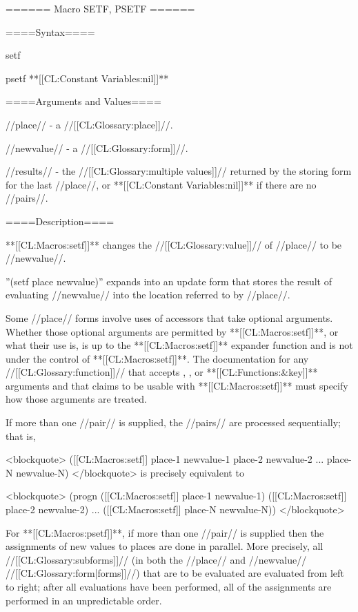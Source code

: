 ====== Macro SETF, PSETF ======

====Syntax====

\DefmacWithValues setf {} {}

\DefmacWithValues psetf {} {**[[CL:Constant Variables:nil]]**}


====Arguments and Values====

//place// - a //[[CL:Glossary:place]]//.

//newvalue// - a //[[CL:Glossary:form]]//.


//results// - the //[[CL:Glossary:multiple values]]// returned by the storing form for the last //place//, or **[[CL:Constant Variables:nil]]** if there are no //pairs//.

====Description====

**[[CL:Macros:setf]]** changes the //[[CL:Glossary:value]]// of //place// to be //newvalue//.

''(setf place newvalue)'' expands into an update form that stores the result of evaluating //newvalue// into the location referred to by //place//.

Some //place// forms involve uses of accessors that take optional arguments. Whether those optional arguments are permitted by **[[CL:Macros:setf]]**, or what their use is, is up to the **[[CL:Macros:setf]]** expander function and is not under the control of **[[CL:Macros:setf]]**. The documentation for any //[[CL:Glossary:function]]// that accepts , , or **[[CL:Functions:&key]]** arguments and that claims to be usable with **[[CL:Macros:setf]]** must specify how those arguments are treated.



If more than one //pair// is supplied, the //pairs// are processed sequentially; that is,

<blockquote> ([[CL:Macros:setf]] place-1 newvalue-1 place-2 newvalue-2 ... place-N newvalue-N) </blockquote> is precisely equivalent to

<blockquote> (progn ([[CL:Macros:setf]] place-1 newvalue-1) ([[CL:Macros:setf]] place-2 newvalue-2) ... ([[CL:Macros:setf]] place-N newvalue-N)) </blockquote>

For **[[CL:Macros:psetf]]**, if more than one //pair// is supplied then the assignments of new values to places are done in parallel. More precisely, all //[[CL:Glossary:subforms]]// (in both the //place// and //newvalue// //[[CL:Glossary:form|forms]]//) that are to be evaluated are evaluated from left to right; after all evaluations have been performed, all of the assignments are performed in an unpredictable order.

